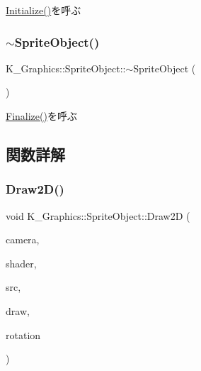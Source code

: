 \mbox{\hyperlink{class_k___graphics_1_1_sprite_object_a7c0ebb444b7484f20c10ba657060d779}{Initialize()}}を呼ぶ 

\mbox{\label{class_k___graphics_1_1_sprite_object_a8df242841b57bc345eb790b1fd24dbb9}} 
\subsubsection{\texorpdfstring{$\sim$\+Sprite\+Object()}{~SpriteObject()}}
{\footnotesize\ttfamily K\+\_\+\+Graphics\+::\+Sprite\+Object\+::$\sim$\+Sprite\+Object (\begin{DoxyParamCaption}{ }\end{DoxyParamCaption})}



\mbox{\hyperlink{class_k___graphics_1_1_sprite_object_ab07a1bdede7da183545bd155193d9f80}{Finalize()}}を呼ぶ 



\subsection{関数詳解}
\mbox{\label{class_k___graphics_1_1_sprite_object_a1d9eb5352fd073b17ea42b53786fa29a}} 
\subsubsection{\texorpdfstring{Draw2\+D()}{Draw2D()}}
{\footnotesize\ttfamily void K\+\_\+\+Graphics\+::\+Sprite\+Object\+::\+Draw2D (\begin{DoxyParamCaption}\item[{\mbox{\hyperlink{class_k___graphics_1_1_camera_class}{Camera\+Class}} $\ast$}]{camera,  }\item[{\mbox{\hyperlink{class_k___graphics_1_1_shader_class}{Shader\+Class}} $\ast$}]{shader,  }\item[{const \mbox{\hyperlink{struct_k___math_1_1_box2_d}{K\+\_\+\+Math\+::\+Box2D}} \&}]{src,  }\item[{const \mbox{\hyperlink{struct_k___math_1_1_box2_d}{K\+\_\+\+Math\+::\+Box2D}} \&}]{draw,  }\item[{float}]{rotation }\end{DoxyParamCaption})}



